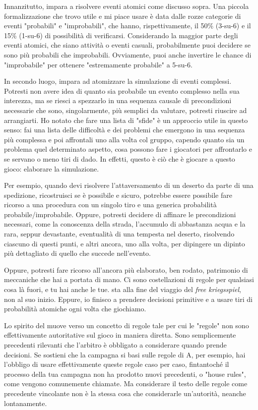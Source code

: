 Innanzitutto, impara a risolvere eventi atomici come discusso sopra. Una piccola formalizzazione che trovo utile e mi piace usare è data dalle rozze categorie di eventi "probabili" e "improbabili", che hanno, rispettivamente, il 50\% (3-su-6) e il 15\% (1-su-6) di possibilità di verificarsi. Considerando la maggior parte degli eventi atomici, che siano attività o eventi casuali, probabilmente puoi decidere se sono più probabili che improbabili. Ovviamente, puoi anche invertire le chance di "improbabile" per ottenere "estremamente probabile" a 5-su-6.

In secondo luogo, impara ad atomizzare la simulazione di eventi complessi. Potresti non avere idea di quanto sia probabile un evento complesso nella sua interezza, ma se riesci a spezzarlo in una sequenza causale di precondizioni necessarie che sono, singolarmente, più semplici da valutare, potresti riuscire ad arrangiarti. Ho notato che fare una lista di "sfide" è un approccio utile in questo senso: fai una lista delle difficoltà e dei problemi che emergono in una sequenza più complessa e poi affrontali uno alla volta col gruppo, capendo quanto sia un problema quel determinato aspetto, cosa possono fare i giocatori per affrontarlo e se servano o meno tiri di dado. In effetti, questo è ciò che è giocare a questo gioco: elaborare la simulazione.

Per esempio, quando devi risolvere l'attaversamento di un deserto da parte di una spedizione, ricostruisci se è possibile e sicuro, potrebbe essere possibile fare ricorso a una procedura con un singolo tiro e una generica probabilità probabile/improbabile. Oppure, potresti decidere di affinare le precondizioni necessari, come la conoscenza della strada, l'accumulo di abbastanza acqua e la rara, seppur devastante, eventualità di una tempesta nel deserto, risolvendo ciascuno di questi punti, e altri ancora, uno alla volta, per dipingere un dipinto più dettagliato di quello che succede nell'evento.

Oppure, potresti fare ricorso all'ancora più elaborato, ben rodato, patrimonio di meccaniche che hai a portata di mano. Ci sono costellazioni di regole per qualsiasi cosa là fuori, e tu hai anche le tue. \dnd{} sta alla fine del viaggio del \textit{free kriegsspiel}, non al suo inizio. Eppure, io finisco a prendere decisioni primitive e a usare tiri di probabilità atomiche ogni volta che giochiamo.


Lo spirito del  muove verso un concetto di regole tale per cui le "regole" non sono effettivamente autoritative sul gioco in maniera diretta. Sono semplicemente precedenti rilevanti che l'arbitro è obbligato a considerare quando prende decisioni. Se sostieni che la campagna si basi sulle regole di A\dnd{}, per esempio, hai l'obbligo di usare effettivamente queste regole caso per caso, fintantoché il processo della tua campagna non ha prodotto nuovi precedenti, o "house rules", come vengono comunemente chiamate. Ma considerare il testo delle regole come precedente vincolante non è la stessa cosa che considerarle un'autorità, neanche lontanamente.

